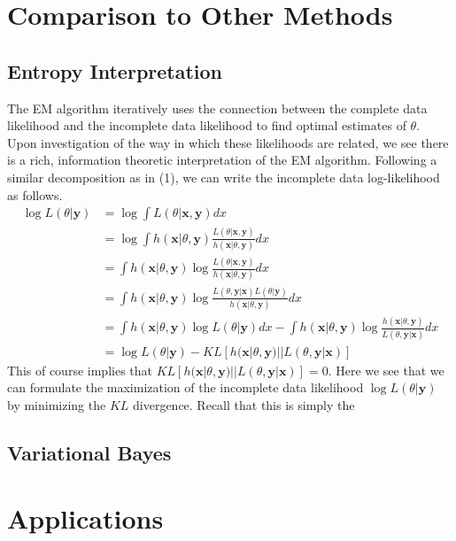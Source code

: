 \documentclass{article}
\begin{document}
\section{Comparison to Other Methods}

\subsection{Entropy Interpretation}
The EM algorithm iteratively uses the connection between the complete data likelihood and the incomplete data likelihood to find optimal estimates of $\theta$. Upon investigation of the way in which these likelihoods are related, we see there is a rich, information theoretic interpretation of the EM algorithm. Following a similar decomposition as in (1), we can write the incomplete data log-likelihood as follows.
\begin{align*}
\log L(\theta|\mathbf{y}) &= \log \int L(\theta|\mathbf{x},\mathbf{y})dx\\
&= \log \int h(\mathbf{x}|\theta,\mathbf{y})\frac{L(\theta|\mathbf{x},\mathbf{y})}{h(\mathbf{x}|\theta,\mathbf{y})}dx\\
&= \int h(\mathbf{x}|\theta,\mathbf{y})\log\frac{L(\theta|\mathbf{x},\mathbf{y})}{h(\mathbf{x}|\theta,\mathbf{y})}dx\\
&= \int h(\mathbf{x}|\theta,\mathbf{y})\log\frac{L(\theta,\mathbf{y}|\mathbf{x})L(\theta|\mathbf{y})}{h(\mathbf{x}|\theta,\mathbf{y})}dx\\
&=\int h(\mathbf{x}|\theta,\mathbf{y})\log L(\theta|\mathbf{y})dx -  \int h(\mathbf{x}|\theta,\mathbf{y})\log\frac{h(\mathbf{x}|\theta,\mathbf{y})}{L(\theta,\mathbf{y}|\mathbf{x})}dx\\
&= \log L(\theta|\mathbf{y}) - KL[h(\mathbf{x}|\theta,\mathbf{y})||L(\theta,\mathbf{y}|\mathbf{x})]
\end{align*}
This of course implies that $KL[h(\mathbf{x}|\theta,\mathbf{y})||L(\theta,\mathbf{y}|\mathbf{x})] = 0$. Here we see that we can formulate the maximization of the incomplete data likelihood $\log L(\theta|\mathbf{y})$
by minimizing the $KL$ divergence. Recall that this is simply the 
\subsection{Variational Bayes}

\section{Applications}
\end{document}
